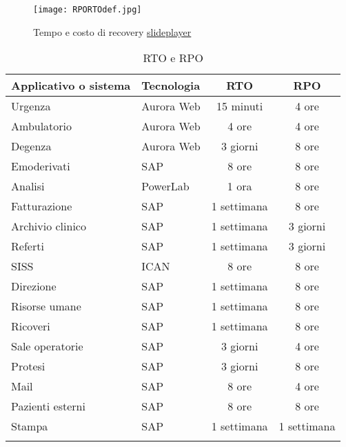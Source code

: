 \begin{figure}[H]
\centering
\texttt{[image: RPORTOdef.jpg]}
\caption{Tempo e costo di recovery \href{https://slideplayer.com/slide/231966/}{slideplayer}}
\end{figure}

\renewcommand\arraystretch{1,5}
\begin{longtable}{p{5cm} p{2.5cm} c c }
\toprule
\textbf{Applicativo o sistema} & \textbf{Tecnologia} & \textbf{RTO} & \textbf{RPO} \\
\toprule
	Urgenza & Aurora Web & 15 minuti & 4 ore \\
    Ambulatorio & Aurora Web &4 ore & 4 ore \\
	Degenza & Aurora Web & 3 giorni & 8 ore \\
	Emoderivati & SAP & 8 ore & 8 ore \\
    Analisi & PowerLab & 1 ora & 8 ore \\
    Fatturazione & SAP & 1 settimana & 8 ore\\
    Archivio clinico & SAP & 1 settimana & 3 giorni\\
    Referti & SAP & 1 settimana & 3 giorni\\
    SISS & ICAN & 8 ore & 8 ore\\
    Direzione & SAP & 1 settimana & 8 ore\\
    Risorse umane & SAP & 1 settimana & 8 ore\\
    Ricoveri & SAP & 1 settimana & 8 ore\\
    Sale operatorie & SAP & 3 giorni & 4 ore\\
    Protesi & SAP & 3 giorni & 8 ore\\
    Mail & SAP & 8 ore & 4 ore\\
    Pazienti esterni & SAP & 8 ore & 8 ore\\
    Stampa & SAP & 1 settimana &  1 settimana\\
\bottomrule
\caption{RTO e RPO }
\end{longtable}







































